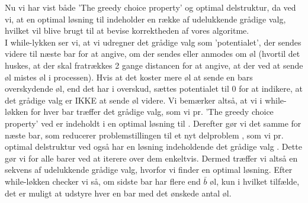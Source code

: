 Nu vi har vist både 'The greedy choice property' og optimal delstruktur, da ved vi, at en optimal løsning til  indeholder en række af udelukkende grådige valg, hvilket vil blive brugt til at bevise korrektheden af vores algoritme.\\
I while-lykken ser vi, at vi udregner det grådige valg som 'potentialet', der sendes videre til næste bar for at angive, om der sendes eller anmodes om øl (hvortil det huskes, at der skal fratrækkes 2 gange distancen for at angive, at der ved at sende øl mistes øl i processen). Hvis at det koster mere øl at sende en bars overskydende øl, end det har i overskud, sættes potentialet til 0 for at indikere, at det grådige valg er IKKE at sende øl videre.
Vi bemærker altså, at vi i while-løkken for hver bar træffer det grådige valg, som vi pr. 'The greedy choice property' ved er indeholdt i en optimal løsning til . Derefter gør vi det samme for næste bar, som reducerer problemstillingen til et nyt delproblem , som vi pr. optimal delstruktur ved også har en løsning indeholdende det grådige valg . Dette gør vi for alle barer ved at iterere over dem enkeltvis. Dermed træffer vi altså en sekvens af udelukkende grådige valg, hvorfor vi finder en optimal løsning.
Efter while-løkken checker vi så, om sidste bar har flere end $\bar{b}$ øl, kun i hvilket tilfælde, det er muligt at udstyre hver en bar med det ønskede antal øl. 
